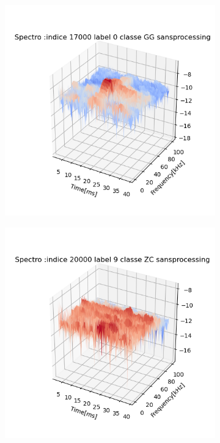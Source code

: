 \begin{figure}[!h]
  \centering
  \begin{subfigure}[b]{0.3\textwidth}
    \includegraphics[width=\textwidth]{./images/indice17000Spectro3Dlabel0classeGGsansprocessingsanszoom.png}
  \end{subfigure}
  \begin{subfigure}[b]{0.3\textwidth}
    \includegraphics[width=\textwidth]{./images/indice20000Spectro3Dlabel9classeZCsansprocessingsanszoom.png}

\end{subfigure}
\end{figure}
